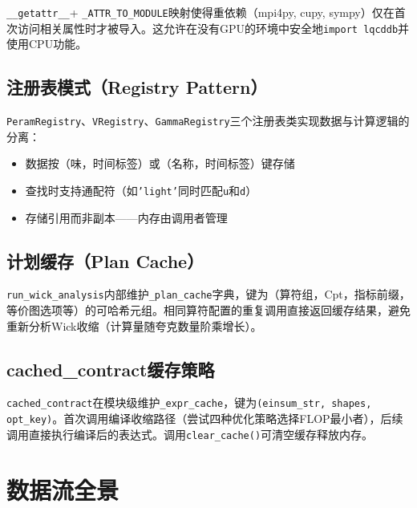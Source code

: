 \documentclass[11pt,a4paper]{ctexart}
\begin{document}
\texttt{\_\_getattr\_\_}+ \texttt{\_ATTR\_TO\_MODULE}映射使得重依赖（mpi4py, cupy, sympy）仅在首次访问相关属性时才被导入。这允许在没有GPU的环境中安全地\texttt{import lqcddb}并使用CPU功能。

\subsection{注册表模式（Registry Pattern）}

\texttt{PeramRegistry}、\texttt{VRegistry}、\texttt{GammaRegistry}三个注册表类实现数据与计算逻辑的分离：
\begin{itemize}
\item 数据按（味，时间标签）或（名称，时间标签）键存储
\item 查找时支持通配符（如\texttt{'light'}同时匹配\texttt{u}和\texttt{d}）
\item 存储引用而非副本——内存由调用者管理
\end{itemize}

\subsection{计划缓存（Plan Cache）}

\texttt{run\_wick\_analysis}内部维护\texttt{\_plan\_cache}字典，键为（算符组，Cpt，指标前缀，等价图选项等）的可哈希元组。相同算符配置的重复调用直接返回缓存结果，避免重新分析Wick收缩（计算量随夸克数量阶乘增长）。

\subsection{cached\_contract缓存策略}

\texttt{cached\_contract}在模块级维护\texttt{\_expr\_cache}，键为\texttt{(einsum\_str, shapes, opt\_key)}。首次调用编译收缩路径（尝试四种优化策略选择FLOP最小者），后续调用直接执行编译后的表达式。调用\texttt{clear\_cache()}可清空缓存释放内存。

\section{数据流全景}
\end{document}
